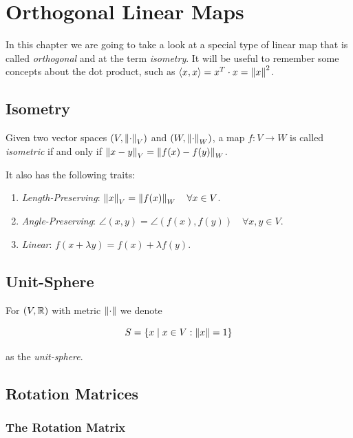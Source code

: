 \chapter{Orthogonal Linear Maps}

In this chapter we are going to take a look at a special type of linear map that is called \emph{orthogonal} 
and at the term \emph{isometry}. It will be useful to remember some concepts about the dot product, such as 
\(\left\langle x, x\right\rangle = x^T \cdot x = \left\| x \right\|^2\).

\section{Isometry}

Given two vector spaces \((V, \left\| \cdot \right\|_V)\) and \((W, \left\| \cdot \right\|_W)\), a map 
\(f: V \to W\) is called \emph{isometric} if and only if \(\left\| x - y \right\|_V = \left\| f(x) - f(y) \right\|_W \).

It also has the following traits:

\begin{enumerate}

    \item \emph{Length-Preserving}: \(\left\| x \right\|_V = \left\| f(x) \right\|_W \quad \forall x \in V\).

    \item \emph{Angle-Preserving}: \(\angle (x,y) = \angle (f(x),f(y)) \quad \forall x,y \in V\).

    \item \emph{Linear}: \(f(x + \lambda y) = f(x) + \lambda f(y)\).

\end{enumerate}

\section{Unit-Sphere}

For \((V, \mathbb{R})\) with metric \(\left\| \cdot \right\|\) we denote 

\[
    S = \{x \mid x \in V : \left\| x \right\| = 1\}
\]

as the \emph{unit-sphere}.

\section{Rotation Matrices}

\subsection{The Rotation Matrix}

